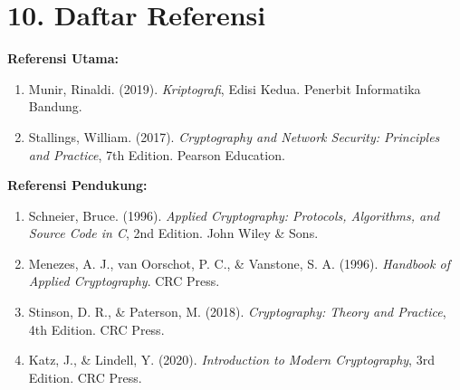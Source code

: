 \documentclass[12pt,a4paper]{article}
\begin{document}
\vspace{0.5cm}

\section*{10. Daftar Referensi}

\textbf{Referensi Utama:}
\begin{enumerate}[leftmargin=*]
  \item Munir, Rinaldi. (2019). \textit{Kriptografi}, Edisi Kedua. Penerbit Informatika Bandung.
  \item Stallings, William. (2017). \textit{Cryptography and Network Security: Principles and Practice}, 7th Edition. Pearson Education.
\end{enumerate}

\textbf{Referensi Pendukung:}
\begin{enumerate}[leftmargin=*]
  \item Schneier, Bruce. (1996). \textit{Applied Cryptography: Protocols, Algorithms, and Source Code in C}, 2nd Edition. John Wiley \& Sons.
  \item Menezes, A. J., van Oorschot, P. C., \& Vanstone, S. A. (1996). \textit{Handbook of Applied Cryptography}. CRC Press.
  \item Stinson, D. R., \& Paterson, M. (2018). \textit{Cryptography: Theory and Practice}, 4th Edition. CRC Press.
  \item Katz, J., \& Lindell, Y. (2020). \textit{Introduction to Modern Cryptography}, 3rd Edition. CRC Press.
\end{enumerate}
\end{document}
